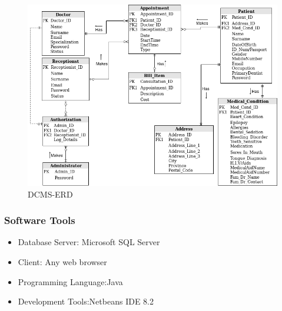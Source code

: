 \documentclass[11 pt]{article}
\begin{document}
    \begin{figure}[h]
    \centering
    
    \includegraphics[width=\linewidth]{Dentist ERD.png}
    \caption{DCMS-ERD}
    \label{fig:ERD}
    \end{figure}
    
    \subsubsection{Software Tools}
    \begin{itemize}
    \item
     Database Server: Microsoft SQL Server
    \item
     Client: Any web browser
     \item
     Programming Language:Java
     \item
     Development Tools:Netbeans IDE 8.2
    \end{itemize}
    
\end{document}
